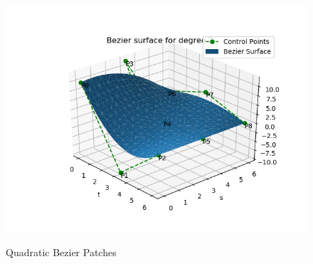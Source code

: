\documentclass[a4paper, 11pt]{article}
\begin{document}
\begin{enumerate}
\begin{enumerate}[label=\alph*.]
\begin{figure}[ht]
{    \includegraphics[scale=0.6]{resources/bezierSurface2.png} \label{fig:quadraticBezierPatch} 
  } 
 \quad 
  \caption{Quadratic Bezier Patches} 
  \label{fig:QuadraticPatch}
\end{figure}
\begin{figure}[ht] 
\end{figure}
\end{enumerate}
\end{enumerate}
\end{document}
